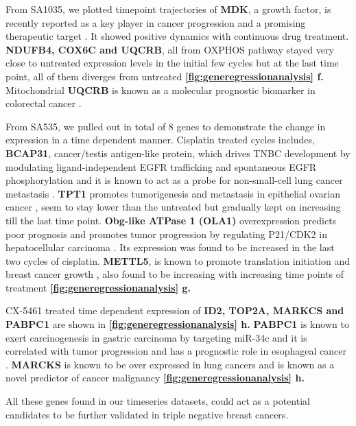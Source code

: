 From SA1035, we plotted timepoint trajectories of \textbf{MDK}, a growth factor, is recently reported as a key player in cancer progression and a promising therapeutic target \cite{filippou2020midkine}. It showed positive dynamics with continuous drug treatment. 
\textbf{NDUFB4, COX6C and UQCRB}, all from \ac{OXPHOS} pathway stayed very close to untreated expression levels in the initial few cycles but at the last time point, all of them diverges from untreated \textbf{\autoref{fig:generegressionanalysis} f.} Mitochondrial \textbf{UQCRB} is known as a molecular prognostic biomarker in colorectal cancer \cite{kim2017mitochondrial}.

From SA535, we pulled out in total of 8 genes to demonstrate the change in expression in a time dependent manner. Cisplatin treated cycles includes, \textbf{BCAP31}, cancer/testis antigen-like protein, which drives TNBC development by modulating ligand-independent EGFR trafficking and spontaneous EGFR phosphorylation and it is known to act as a probe for non-small-cell lung cancer metastasis
\cite{fu2019bcap31, wang2020bcap31}. \textbf{TPT1} promotes tumorigenesis and metastasis in epithelial ovarian cancer \cite{wu2019lncrna}, seem to stay lower than the untreated but gradually kept on increasing till the last time point. \textbf{Obg-like ATPase 1 (OLA1)} overexpression predicts poor prognosis and promotes tumor progression by regulating P21/CDK2 in hepatocellular carcinoma \cite{huang2020obg}. Its expression was found to be increased in the last two cycles of cisplatin. \textbf{METTL5}, is known to promote translation initiation and breast cancer growth \cite{zeng2020roles}, also found to be increasing with increasing time points of treatment \textbf{\autoref{fig:generegressionanalysis} g.}

CX-5461 treated time dependent expression of \textbf{ID2, TOP2A, MARKCS and PABPC1} are shown in \textbf{\autoref{fig:generegressionanalysis} h.}
\textbf{PABPC1} is known to exert carcinogenesis in gastric carcinoma by targeting miR-34c and it is correlated with tumor progression and has a prognostic role in esophageal cancer \cite{zhu2015pabpc1,takashima2006expression}. \textbf{MARCKS} is known to be over expressed in lung cancers and is known as a novel predictor of cancer malignancy  \cite{reddy2014marcks, chen2014novel} \textbf{\autoref{fig:generegressionanalysis} h.}

All these genes found in our timeseries datasets, could act as a potential candidates to be further validated in triple negative breast cancers.


